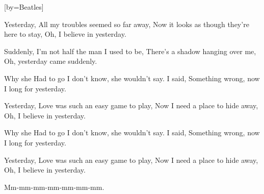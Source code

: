  

[by=Beatles]




\beginverse
Yesterday,
All my troubles seemed so far away,
Now it looks as though they're here to stay,
Oh, I believe in yesterday.
\endverse

\beginverse
Suddenly,
I'm not half the man I used to be,
There's a shadow hanging over me,
Oh, yesterday came suddenly.
\endverse

\beginverse

Why she
Had to go I don't know, she wouldn't say.
I said,
Something wrong, now I long for yesterday.
\endverse

\beginverse

Yesterday,
Love was such an easy game to play,
Now I need a place to hide away,
Oh, I believe in yesterday.
\endverse

\beginverse

Why she
Had to go I don't know, she wouldn't say.
I said,
Something wrong, now I long for yesterday.
\endverse

\beginverse

Yesterday,
Love was such an easy game to play,
Now I need a place to hide away,
Oh, I believe in yesterday.

Mm-mm-mm-mm-mm-mm-mm. 
\endverse




\endsong
